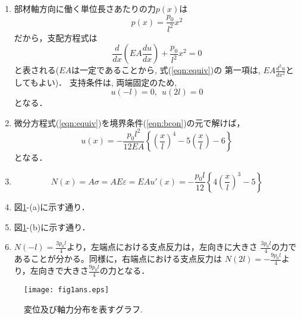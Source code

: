 \documentclass[10pt,a4j]{jarticle}
\begin{document}
\begin{enumerate}
\item
部材軸方向に働く単位長さあたりの力$p(x)$は
\begin{equation}
	p(x)= \frac{p_0}{l^2}x^2
	\label{eqn:body_force}
\end{equation}
だから，支配方程式は
\begin{equation}
	\frac{d}{dx  }\left( EA\frac{du}{dx}\right)
	+
	\frac{p_0}{l^2}x^2
	=0
	\label{eqn:equiv}
\end{equation}
と表される($EA$は一定であることから, 式(\ref{eqn:equiv})の
第一項は, $EA\frac{d^2u}{dx^2}$としてもよい)．
支持条件は, 両端固定のため,
\begin{equation}
	u(-l)=0, \ \ u(2l)=0
	\label{eqn:bcon}
\end{equation}
となる．
\item
微分方程式(\ref{eqn:equiv})を境界条件(\ref{eqn:bcon})の元で解けば，
\begin{equation}
	u(x)=
	-
	\frac{p_0l^2}{12EA}
	\left\{ 
		\left(\frac{x}{l}\right)^4
		-
		5
		\left(\frac{x}{l}\right)
		-6
	\right\}
	\label{eqn:disp}
\end{equation}
となる．
\item
\begin{equation}
	N(x)= A \sigma = AE\varepsilon=EA u'(x)
	=
	-\frac{p_0l}{12}
		\left\{
		4\left( \frac{x}{l} \right)^3 -5
		\right\}
\end{equation}
\item
図\ref{fig:fig1}-(a)に示す通り．
\item
図\ref{fig:fig1}-(b)に示す通り．
\item
	$N(-l)=\frac{3p_0l}{4}$より，左端点における支点反力は，左向きに大きさ
	$\frac{3p_0l}{4}$の力であることが分かる。同様に，右端点における支点反力は
	$N(2l)=-\frac{9p_0l}{4}$より，左向きで大きさ$\frac{9p_0l}{4}$の力となる．
\end{enumerate}
\begin{figure}[h]
	\vspace{-3mm}
	\begin{center}
	\texttt{[image: fig1ans.eps]} 
	\end{center}
	\vspace{-5mm}
	\caption{変位及び軸力分布を表すグラフ.} 
	\label{fig:fig1}
\end{figure}
\end{document}
